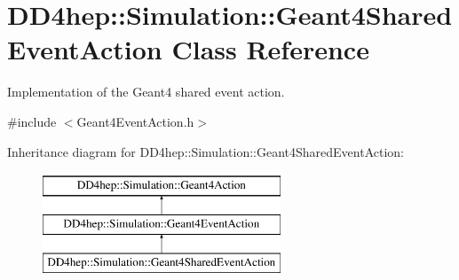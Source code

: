 \hypertarget{class_d_d4hep_1_1_simulation_1_1_geant4_shared_event_action}{}\section{D\+D4hep\+:\+:Simulation\+:\+:Geant4\+Shared\+Event\+Action Class Reference}
\label{class_d_d4hep_1_1_simulation_1_1_geant4_shared_event_action}


Implementation of the Geant4 shared event action.  




{\ttfamily \#include $<$Geant4\+Event\+Action.\+h$>$}

Inheritance diagram for D\+D4hep\+:\+:Simulation\+:\+:Geant4\+Shared\+Event\+Action\+:\begin{figure}[H]
\begin{center}
\leavevmode
\includegraphics[height=3.000000cm]{class_d_d4hep_1_1_simulation_1_1_geant4_shared_event_action}
\end{center}
\end{figure}
